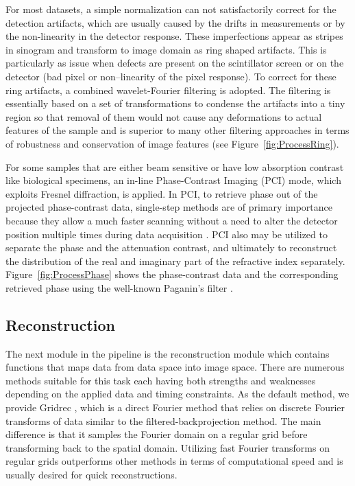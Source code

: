 \documentclass[pdf]{iucr}              %
\begin{document}
For most datasets, a simple normalization can not satisfactorily correct for the detection artifacts, which are usually caused by the drifts in measurements or by the non-linearity in the detector response. These imperfections appear as stripes in sinogram and transform to image domain as ring shaped artifacts. This is particularly as issue when defects are present on the scintillator screen or on the detector (bad pixel or non--linearity of the pixel response). To correct for these ring artifacts, a combined wavelet-Fourier filtering  \cite{Munch:09} is adopted. The filtering is essentially based on a set of transformations to condense the artifacts into a tiny region so that removal of them would not cause any deformations to actual features of the sample and is superior to many other filtering approaches in terms of robustness and conservation of image features (see Figure~\ref{fig:ProcessRing}).

For some samples that are either beam sensitive or have low absorption contrast like biological specimens, an in-line Phase-Contrast Imaging (PCI) mode, which exploits Fresnel diffraction, is applied. In PCI, to retrieve phase out of the projected phase-contrast data, single-step methods are of primary importance because they allow a much faster scanning without a need to alter the detector position multiple times during data acquisition \cite{Burvall:11}. PCI also may be utilized to separate the phase and the attenuation contrast, and ultimately to reconstruct the distribution of the real and imaginary part of the refractive index separately. Figure~\ref{fig:ProcessPhase} shows the phase-contrast data and the corresponding retrieved phase using the well-known Paganin's filter \cite{Paganin_2002}.


\subsection{Reconstruction}

The next module in the pipeline is the reconstruction module which contains functions that maps data from data space into image space. There are numerous methods suitable for this task each having both strengths and weaknesses depending on the applied data and timing constraints. As the default method, we provide Gridrec \cite{donath_spie_2006}, which is a direct Fourier method that relies on discrete Fourier transforms of data similar to the filtered-backprojection method. The main difference is that it samples the Fourier domain on a regular grid before transforming back to the spatial domain. Utilizing fast Fourier transforms on regular grids outperforms other methods in terms of computational speed and is usually desired for quick reconstructions.
\end{document}
